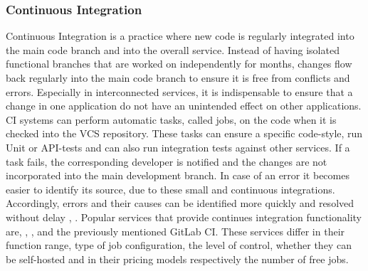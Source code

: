 \documentclass[12pt, a4paper]{article}
\begin{document}
        \subsubsection{Continuous Integration}
        Continuous Integration is a practice where new code is regularly integrated into the main code branch and into the overall service. Instead of having isolated functional branches that are worked on independently for months, changes flow back regularly into the main code branch to ensure it is free from conflicts and errors. Especially in interconnected services, it is indispensable to ensure that a change in one application do not have an unintended effect on other applications. \ac{CI} systems can perform automatic tasks, called jobs, on the code when it is checked into the \ac{VCS} repository. These tasks can ensure a specific code-style, run Unit or \acs{API}-tests and can also run integration tests against other services. If a task fails, the corresponding developer is notified and the changes are not incorporated into the main development branch. In case of an error it becomes easier to identify its source, due to these small and continuous integrations. Accordingly, errors and their causes can be identified more quickly and resolved without delay \cite{azuredevops}, \cite{base_devops}.\newline
        Popular services that provide continues integration functionality are, , ,  and the previously mentioned GitLab \ac{CI}. These services differ in their function range, type of job configuration, the level of control, whether they can be self-hosted and in their pricing models respectively the number of free jobs.
\end{document}
